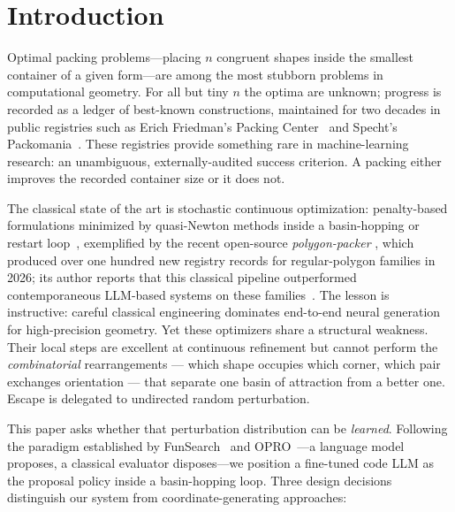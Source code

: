 \documentclass[pdflatex,sn-mathphys-num]{sn-jnl}
\theoremstyle{thmstyleone}%
\begin{document}
\maketitle

\section{Introduction}\label{sec:intro}

Optimal packing problems---placing $n$ congruent shapes inside the smallest
container of a given form---are among the most stubborn problems in
computational geometry. For all but tiny $n$ the optima are unknown; progress
is recorded as a ledger of best-known constructions, maintained for two
decades in public registries such as Erich Friedman's Packing
Center~\cite{friedman2009survey} and Specht's
Packomania~\cite{specht2024packomania}. These registries provide something
rare in machine-learning research: an unambiguous, externally-audited
success criterion. A packing either improves the recorded container size or
it does not.

The classical state of the art is stochastic continuous optimization:
penalty-based formulations minimized by quasi-Newton methods inside a
basin-hopping or restart loop~\cite{wales1997basinhopping,liu1989lbfgs},
exemplified by the recent open-source \emph{polygon-packer}
\cite{vallejo2026packer}, which produced over one hundred new
registry records for regular-polygon families in 2026; its author reports
that this classical pipeline outperformed contemporaneous LLM-based
systems on these families~\cite{vallejo2026video}. The lesson is
instructive: careful classical engineering dominates end-to-end neural
generation for high-precision geometry. Yet these optimizers share a
structural weakness. Their local steps are excellent at continuous
refinement but cannot perform the \emph{combinatorial} rearrangements ---
which shape occupies which corner, which pair exchanges orientation --- that
separate one basin of attraction from a better one. Escape is delegated to
undirected random perturbation.

This paper asks whether that perturbation distribution can be
\emph{learned}. Following the paradigm established by
FunSearch~\cite{romeraparedes2024funsearch} and
OPRO~\cite{yang2024opro}---a language model proposes, a classical evaluator
disposes---we position a fine-tuned code LLM as the proposal policy inside a
basin-hopping loop. Three design decisions distinguish our system from
coordinate-generating approaches:
\end{document}
